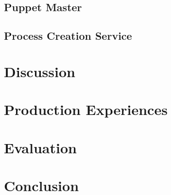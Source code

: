 \documentclass[times, 10pt, twocolumn]{article}
\begin{document}
\subsection{Puppet Master}






\subsection{Process Creation Service}






\section{Discussion}




\section{Production Experiences}





\section{Evaluation}






\section{Conclusion}
\end{document}
